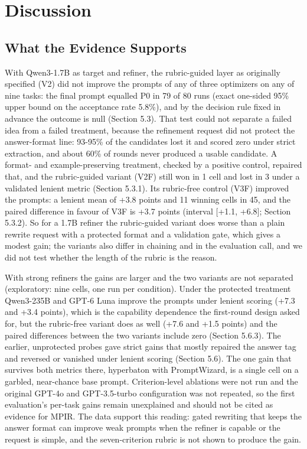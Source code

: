 \documentclass{ieeeaccess}
\begin{document}
\section{Discussion}

\subsection{What the Evidence Supports}

With Qwen3-1.7B as target and refiner, the rubric-guided layer as originally specified (V2) did not improve the prompts of any of three optimizers on any of nine tasks: the final prompt equalled P0 in 79 of 80 runs (exact one-sided 95\% upper bound on the acceptance rate 5.8\%), and by the decision rule fixed in advance the outcome is null (Section 5.3). That test could not separate a failed idea from a failed treatment, because the refinement request did not protect the answer-format line: 93-95\% of the candidates lost it and scored zero under strict extraction, and about 60\% of rounds never produced a usable candidate. A format- and example-preserving treatment, checked by a positive control, repaired that, and the rubric-guided variant (V2F) still won in 1 cell and lost in 3 under a validated lenient metric (Section 5.3.1). Its rubric-free control (V3F) improved the prompts: a lenient mean of +3.8 points and 11 winning cells in 45, and the paired difference in favour of V3F is +3.7 points (interval [+1.1, +6.8]; Section 5.3.2). So for a 1.7B refiner the rubric-guided variant does worse than a plain rewrite request with a protected format and a validation gate, which gives a modest gain; the variants also differ in chaining and in the evaluation call, and we did not test whether the length of the rubric is the reason.

With strong refiners the gains are larger and the two variants are not separated (exploratory: nine cells, one run per condition). Under the protected treatment Qwen3-235B and GPT-6 Luna improve the prompts under lenient scoring (+7.3 and +3.4 points), which is the capability dependence the first-round design asked for, but the rubric-free variant does as well (+7.6 and +1.5 points) and the paired differences between the two variants include zero (Section 5.6.3). The earlier, unprotected probes gave strict gains that mostly repaired the answer tag and reversed or vanished under lenient scoring (Section 5.6). The one gain that survives both metrics there, hyperbaton with PromptWizard, is a single cell on a garbled, near-chance base prompt. Criterion-level ablations were not run and the original GPT-4o and GPT-3.5-turbo configuration was not repeated, so the first evaluation's per-task gains remain unexplained and should not be cited as evidence for MPIR. The data support this reading: gated rewriting that keeps the answer format can improve weak prompts when the refiner is capable or the request is simple, and the seven-criterion rubric is not shown to produce the gain.
\end{document}
